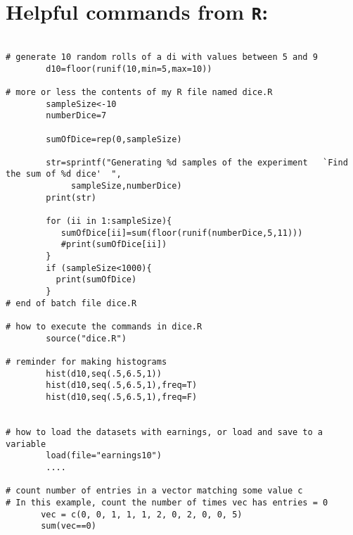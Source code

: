 \documentclass{report}
\begin{document}
\newpage


\section*{Helpful commands from {\tt R}:}

\bigskip

\begin{verbatim}

# generate 10 random rolls of a di with values between 5 and 9
        d10=floor(runif(10,min=5,max=10))               
                                   
# more or less the contents of my R file named dice.R                                                                               
        sampleSize<-10
        numberDice=7

        sumOfDice=rep(0,sampleSize)

        str=sprintf("Generating %d samples of the experiment   `Find the sum of %d dice'  ",
             sampleSize,numberDice)
        print(str)

        for (ii in 1:sampleSize){
           sumOfDice[ii]=sum(floor(runif(numberDice,5,11)))
           #print(sumOfDice[ii])
        }
        if (sampleSize<1000){
          print(sumOfDice)
        }
# end of batch file dice.R

# how to execute the commands in dice.R
        source("dice.R")
        
# reminder for making histograms
        hist(d10,seq(.5,6.5,1))        
        hist(d10,seq(.5,6.5,1),freq=T)
        hist(d10,seq(.5,6.5,1),freq=F)


# how to load the datasets with earnings, or load and save to a variable
        load(file="earnings10")
        ....

# count number of entries in a vector matching some value c
# In this example, count the number of times vec has entries = 0
       vec = c(0, 0, 1, 1, 1, 2, 0, 2, 0, 0, 5)
       sum(vec==0)

\end{verbatim}
\end{document}
